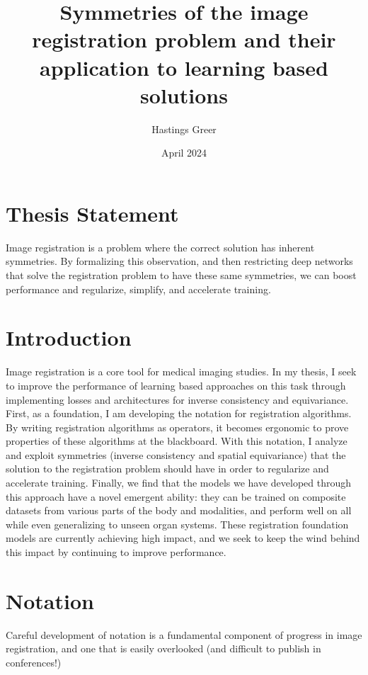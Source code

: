 \documentclass{article}
\title{Symmetries of the image registration problem and their application to learning based solutions}
\author{Hastings Greer }
\date{April 2024}
\begin{document}
\maketitle

\section{Thesis Statement}
Image registration is a problem where the correct solution has inherent symmetries. By formalizing this observation, and then restricting deep networks that solve the registration problem to have these same symmetries, we can boost performance and regularize, simplify, and accelerate training. 

\section{Introduction}

Image registration is a core tool for medical imaging studies. In my thesis, I
seek to improve the performance of learning based approaches on this task
through implementing losses and architectures for inverse consistency and equivariance. First, as a foundation, I am developing the
notation for registration algorithms. By writing registration algorithms as
operators, it becomes ergonomic to prove properties of these algorithms at the
blackboard.
With this notation, I analyze and exploit symmetries (inverse consistency and spatial
equivariance) that the solution to the registration problem should have in
order to regularize and accelerate training. Finally, we find that the models we have developed through this approach have a novel emergent ability: they can be trained on composite datasets from various parts of the body and modalities, and perform well on all while even generalizing to unseen organ systems. These registration foundation models are currently achieving high impact, and we seek to keep the wind behind this impact by continuing to improve performance.

\section{Notation}

Careful development of notation is a fundamental component of progress in image
registration, and one that is easily overlooked (and difficult to publish in
conferences!)
\end{document}

